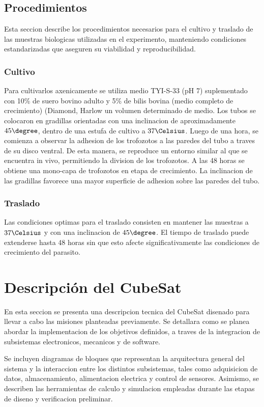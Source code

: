   \subsection{Procedimientos}
    Esta seccion describe los procedimientos necesarios para el cultivo y traslado de las muestras
    biologicas utilizadas en el experimento, manteniendo condiciones estandarizadas que
    aseguren su viabilidad y reproducibilidad.

    \subsubsection{Cultivo}
    Para cultivarlos axenicamente se utiliza medio TYI-S-33 (pH 7) suplementado con 10\% de
    suero bovino adulto y 5\% de bilis bovina (medio completo de crecimiento) (Diamond, Harlow
    un volumen determinado de medio. Los tubos se colocaron en gradillas orientadas con una
    inclinacion de aproximadamente $45\degree$, dentro de una estufa de cultivo a $37 \Celsius$.
    Luego de una hora, se comienza a observar la adhesion de los trofozotos a las paredes del
    tubo a traves de su disco ventral. De esta manera, se reproduce un entorno similar al que se
    encuentra in vivo, permitiendo la division de los trofozotos. A las 48 horas se obtiene una
    mono-capa de trofozotos en etapa de crecimiento. La inclinacion de las gradillas favorece
    una mayor superficie de adhesion sobre las paredes del tubo.

    \subsubsection{Traslado}
    Las condiciones optimas para el traslado consisten en mantener las muestras a $37\Celsius$ y con
    una inclinacion de $45\degree$. El tiempo de traslado puede extenderse hasta 48 horas sin que esto
    afecte significativamente las condiciones de crecimiento del parasito.

\section{Descripción del CubeSat}
En esta seccion se presenta una descripcion tecnica del CubeSat disenado para llevar a
cabo las misiones planteadas previamente. Se detallara como se planea abordar la implementacion de
los objetivos definidos, a traves de la integracion de subsistemas electronicos, mecanicos y de software.

Se incluyen diagramas de bloques que representan la arquitectura general del sistema y la
interaccion entre los distintos subsistemas, tales como adquisicion de datos, almacenamiento,
alimentacion electrica y control de sensores. Asimismo, se describen las herramientas de
calculo y simulacion empleadas durante las etapas de diseno y verificacion preliminar.

